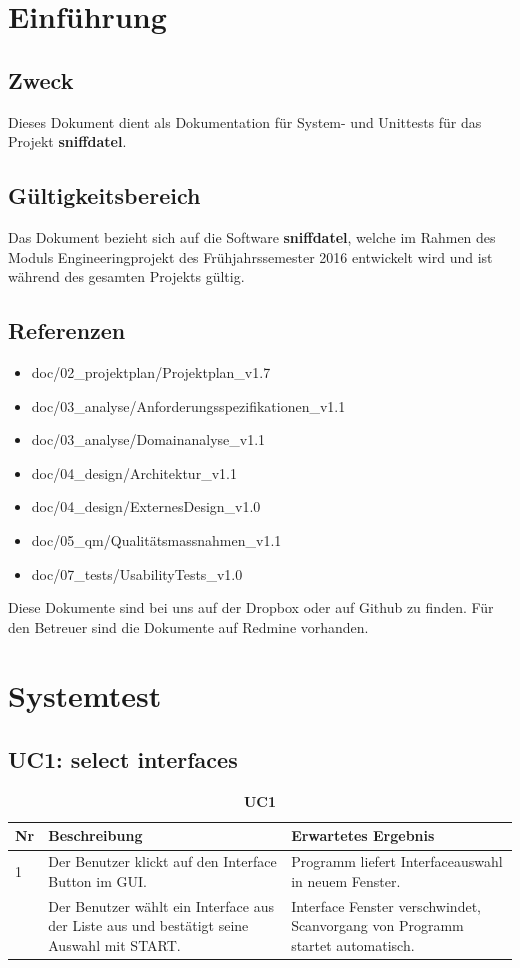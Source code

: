 \documentclass[a4,12pt]{scrartcl}
\begin{document}
\section{Einführung}
\subsection{Zweck}
Dieses Dokument dient als Dokumentation für System- und Unittests für das Projekt \textbf{sniffdatel}. 
\subsection{Gültigkeitsbereich}
Das Dokument bezieht sich auf die Software \textbf{sniffdatel}, welche im Rahmen des Moduls Engineeringprojekt des Frühjahrssemester 2016 entwickelt wird und ist während des gesamten Projekts gültig. 
\subsection{Referenzen}
\begin{itemize}
\item doc/02\_projektplan/Projektplan\_v1.7
\item doc/03\_analyse/Anforderungsspezifikationen\_v1.1
\item doc/03\_analyse/Domainanalyse\_v1.1
\item doc/04\_design/Architektur\_v1.1
\item doc/04\_design/ExternesDesign\_v1.0
\item doc/05\_qm/Qualitätsmassnahmen\_v1.1
\item doc/07\_tests/UsabilityTests\_v1.0
\end{itemize}

\noindent Diese Dokumente sind bei uns auf der Dropbox oder auf Github zu finden. Für den Betreuer sind die Dokumente auf Redmine vorhanden. 
\newpage

\section{Systemtest}

\subsection{UC1: select interfaces}
\begin{table}[H]
\centering
    \begin{tabular}{@{} p{0.5cm} p{7cm} p{6cm} @{}}\toprule    
    {Nr} & {Beschreibung} & {Erwartetes Ergebnis}\\ \midrule
    1 & Der Benutzer klickt auf den Interface Button im GUI. & Programm liefert Interfaceauswahl in neuem Fenster.\\ \addlinespace
    2 & Der Benutzer wählt ein Interface aus der Liste aus und bestätigt seine Auswahl mit START. & Interface Fenster verschwindet, Scanvorgang von Programm startet automatisch. \\
    \bottomrule
    \end{tabular}
\caption{\textbf{UC1}}
\end{table}
\end{document}
